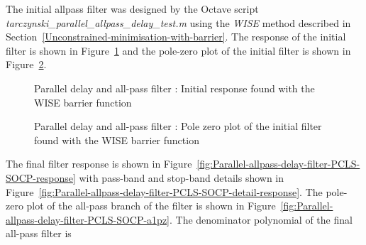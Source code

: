 \documentclass[a4paper,twoside,10pt,english]{report}
\begin{document}
The initial allpass filter was designed by the Octave script 
\emph{tarczynski\_parallel\_allpass\_delay\_test.m} using the \emph{WISE}
method described in 
Section~\ref{Unconstrained-minimisation-with-barrier}. The response
of the initial filter is shown in
Figure~\ref{fig:Parallel-allpass-delay-filter-initial-response} and the pole-zero
plot of the initial filter is shown in
Figure~\ref{fig:Parallel-allpass-delay-filter-initial-response-pz}.
\begin{figure}[!htbp]
\begin{center}
\scalebox{0.7}{}
\caption{Parallel delay and all-pass filter : Initial response found with the WISE barrier function}
\label{fig:Parallel-allpass-delay-filter-initial-response}
\end{center}
\end{figure}
\begin{figure}[!htbp]
\begin{center}
\scalebox{0.7}{}
\caption{Parallel delay and all-pass filter : Pole zero plot of the initial filter found with the WISE barrier function}
\label{fig:Parallel-allpass-delay-filter-initial-response-pz}
\end{center}
\end{figure}

The final filter response is shown in
Figure~\ref{fig:Parallel-allpass-delay-filter-PCLS-SOCP-response} with pass-band
and stop-band details shown in 
Figure~\ref{fig:Parallel-allpass-delay-filter-PCLS-SOCP-detail-response}. 
The pole-zero plot of the all-pass branch of the filter is shown in 
Figure~\ref{fig:Parallel-allpass-delay-filter-PCLS-SOCP-a1pz}.
The denominator polynomial of the final all-pass filter is
\begin{small}

\end{small}
\end{document}
